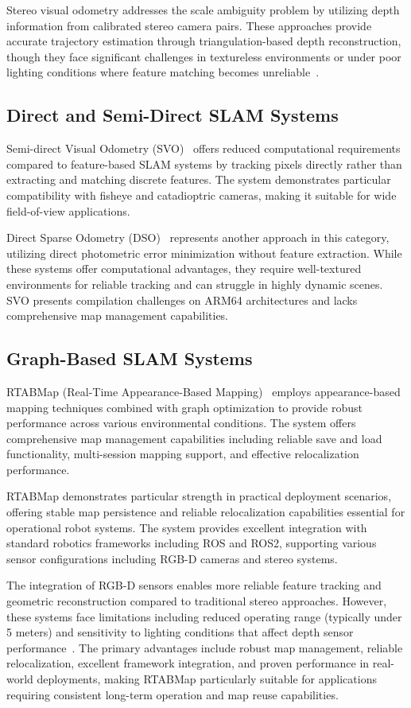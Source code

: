 Stereo visual odometry addresses the scale ambiguity problem by utilizing depth information from calibrated stereo camera pairs. These approaches provide accurate trajectory estimation through triangulation-based depth reconstruction, though they face significant challenges in textureless environments or under poor lighting conditions where feature matching becomes unreliable~\cite{geiger2011stereoscan}.

\subsection{Direct and Semi-Direct SLAM Systems}
Semi-direct Visual Odometry (SVO)~\cite{forster2014svo} offers reduced computational requirements compared to feature-based SLAM systems by tracking pixels directly rather than extracting and matching discrete features. The system demonstrates particular compatibility with fisheye and catadioptric cameras, making it suitable for wide field-of-view applications.

Direct Sparse Odometry (DSO)~\cite{engel2017direct} represents another approach in this category, utilizing direct photometric error minimization without feature extraction. While these systems offer computational advantages, they require well-textured environments for reliable tracking and can struggle in highly dynamic scenes. SVO presents compilation challenges on ARM64 architectures and lacks comprehensive map management capabilities.

\subsection{Graph-Based SLAM Systems}
RTABMap (Real-Time Appearance-Based Mapping)~\cite{labbe2019rtab} employs appearance-based mapping techniques combined with graph optimization to provide robust performance across various environmental conditions. The system offers comprehensive map management capabilities including reliable save and load functionality, multi-session mapping support, and effective relocalization performance.

RTABMap demonstrates particular strength in practical deployment scenarios, offering stable map persistence and reliable relocalization capabilities essential for operational robot systems. The system provides excellent integration with standard robotics frameworks including ROS and ROS2, supporting various sensor configurations including RGB-D cameras and stereo systems.

The integration of RGB-D sensors enables more reliable feature tracking and geometric reconstruction compared to traditional stereo approaches. However, these systems face limitations including reduced operating range (typically under 5 meters) and sensitivity to lighting conditions that affect depth sensor performance~\cite{henry2012rgb}. The primary advantages include robust map management, reliable relocalization, excellent framework integration, and proven performance in real-world deployments, making RTABMap particularly suitable for applications requiring consistent long-term operation and map reuse capabilities.

